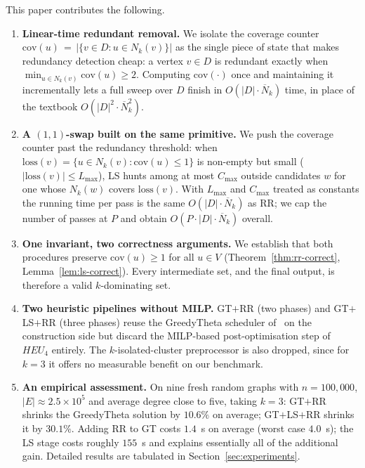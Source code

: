 \documentclass[11pt,a4paper]{article}
\newcommand{\Nk}{\overline{N}_k}
\newcommand{\cov}{\mathrm{cov}}
\newcommand{\loss}{\mathrm{loss}}
\begin{document}
This paper contributes the following.

\begin{enumerate}[nosep]
\item \textbf{Linear-time redundant removal.}
  We isolate the coverage counter
  $\cov(u)\,=\,|\{v\in D:u\in N_k(v)\}|$
  as the single piece of state that makes redundancy detection cheap:
  a vertex $v\in D$ is redundant exactly when
  $\min_{u\in N_k(v)}\cov(u)\ge 2$. Computing $\cov(\cdot)$ once and
  maintaining it incrementally lets a full sweep over $D$ finish in
  $O(|D|\cdot\Nk)$ time, in place of the textbook
  $O(|D|^2\cdot\Nk^2)$.

\item \textbf{A $(1,1)$-swap built on the same primitive.}
  We push the coverage counter past the redundancy threshold: when
  $\loss(v)=\{u\in N_k(v):\cov(u)\le 1\}$ is non-empty but
  small ($|\loss(v)|\le L_{\max}$), LS hunts among at most $C_{\max}$
  outside candidates $w$ for one whose $N_k(w)$ covers $\loss(v)$.
  With $L_{\max}$ and $C_{\max}$ treated as constants the running time
  per pass is the same $O(|D|\cdot\Nk)$ as RR; we cap the number of
  passes at $P$ and obtain $O(P\cdot|D|\cdot\Nk)$ overall.

\item \textbf{One invariant, two correctness arguments.}
  We establish that both procedures preserve
  $\cov(u)\ge 1$ for all $u\in V$
  (Theorem~\ref{thm:rr-correct}, Lemma~\ref{lem:ls-correct}). Every
  intermediate set, and the final output, is therefore a valid
  $k$-dominating set.

\item \textbf{Two heuristic pipelines without MILP.}
  GT$+$RR (two phases) and GT$+$LS$+$RR (three phases) reuse the
  GreedyTheta scheduler of~\cite{nguyen2020} on the construction
  side but discard the MILP-based post-optimisation step of
  $\mathit{HEU_4}$ entirely. The $k$-isolated-cluster preprocessor
  is also dropped, since for $k=3$ it offers no measurable benefit on
  our benchmark.

\item \textbf{An empirical assessment.}
  On nine fresh random graphs with $n=100{,}000$,
  $|E|\!\approx\!2.5\!\times\!10^5$ and average degree close to five,
  taking $k=3$: GT$+$RR shrinks the GreedyTheta solution by
  $10.6\%$ on average; GT$+$LS$+$RR shrinks it by $30.1\%$. Adding RR
  to GT costs $1.4$~s on average (worst case $4.0$~s); the LS stage
  costs roughly $155$~s and explains essentially all of the additional
  gain. Detailed results are tabulated in Section~\ref{sec:experiments}.
\end{enumerate}
\end{document}
